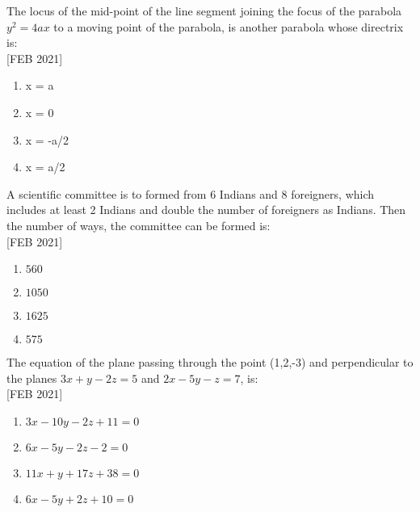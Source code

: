 \iffalse
  \title{Assignment}
  \author{ee24btech11030}
  \section{mcq-single}
\fi

\item The locus of the mid-point of the line segment joining the focus of the parabola $y^2 = 4ax$ to a moving point of the parabola, is another parabola whose directrix is: \\ \hfill{[FEB 2021]}
    \begin{multicols}{4}
    \begin{enumerate}
        \item x = a
        \item x = 0
        \item x = -a/2
        \item x = a/2
    \end{enumerate}
    \end{multicols}
    \item A scientific committee is to formed from 6 Indians and 8 foreigners, which includes at least 2 Indians and double the number of foreigners as Indians. Then the number of ways, the committee can be formed is: \\\hfill{[FEB 2021]}
    \begin{multicols}{4}
    \begin{enumerate}
        \item $560$
        \item $1050$
        \item $1625$
        \item $575$
    \end{enumerate}
    \end{multicols}
    \item The equation of the plane passing through the point (1,2,-3) and perpendicular to the planes $3x + y - 2z = 5$ and $2x - 5y - z = 7$, is: \\\hfill{[FEB 2021]}
    \begin{enumerate}
        \item $3x - 10y - 2z + 11 = 0$ 
        \item $6x - 5y - 2z - 2 = 0$
        \item $11x + y + 17z + 38 = 0$
        \item $6x - 5y + 2z + 10 = 0$
    \end{enumerate} 
